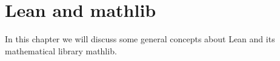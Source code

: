 \chapter{Lean and mathlib}

In this chapter we will discuss some general concepts about Lean and its mathematical library mathlib. 




